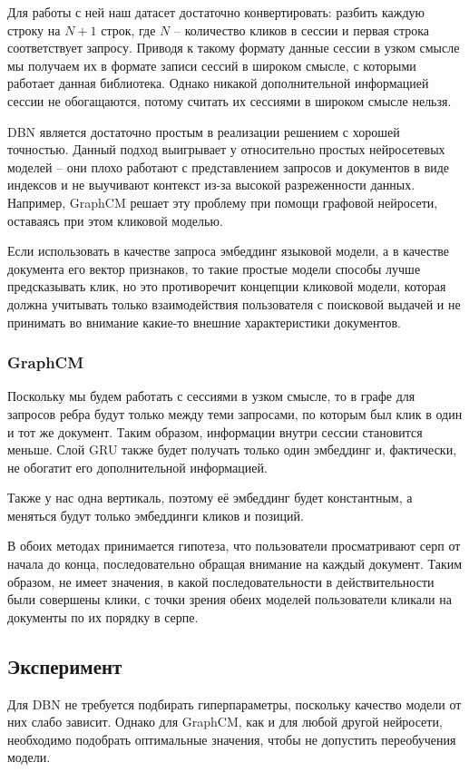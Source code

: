 \documentclass[diploma]{nanolab2015}
\begin{document}
Для работы с ней наш датасет достаточно конвертировать: разбить каждую строку на $N+1$ строк, где $N$ -- количество кликов в сессии и первая строка соответствует запросу. Приводя к такому формату данные сессии в узком смысле мы получаем их в формате записи сессий в широком смысле, с которыми работает данная библиотека. Однако никакой дополнительной информацией сессии не обогащаются, потому считать их сессиями в широком смысле нельзя.

DBN является достаточно простым в реализации решением с хорошей точностью. Данный подход выигрывает у относительно простых нейросетевых моделей -- они плохо работают с представлением запросов и документов в виде индексов и не выучивают контекст из-за высокой разреженности данных. Например, GraphCM решает эту проблему при помощи графовой нейросети, оставаясь при этом кликовой моделью.

Если использовать в качестве запроса эмбеддинг языковой модели, а в качестве документа его вектор признаков, то такие простые модели способы лучше предсказывать клик, но это противоречит концепции кликовой модели, которая должна учитывать только взаимодействия пользователя с поисковой выдачей и не принимать во внимание какие-то внешние характеристики документов.

\subsubsection{GraphCM}
Поскольку мы будем работать с сессиями в узком смысле, то в графе для запросов ребра будут только между теми запросами, по которым был клик в один и тот же документ. Таким образом, информации внутри сессии становится меньше. Слой GRU также будет получать только один эмбеддинг и, фактически, не обогатит его дополнительной информацией.

Также у нас одна вертикаль, поэтому её эмбеддинг будет константным, а меняться будут только эмбеддинги кликов и позиций.

\bigbreak

В обоих методах принимается гипотеза, что пользователи просматривают серп от начала до конца, последовательно обращая внимание на каждый документ. Таким образом, не имеет значения, в какой последовательности в действительности были совершены клики, с точки зрения обеих моделей пользователи кликали на документы по их порядку в серпе.
\subsection{Эксперимент}
Для DBN не требуется подбирать гиперпараметры, поскольку качество модели от них слабо зависит. Однако для GraphCM, как и для любой другой нейросети, необходимо подобрать оптимальные значения, чтобы не допустить переобучения модели.
\end{document}
